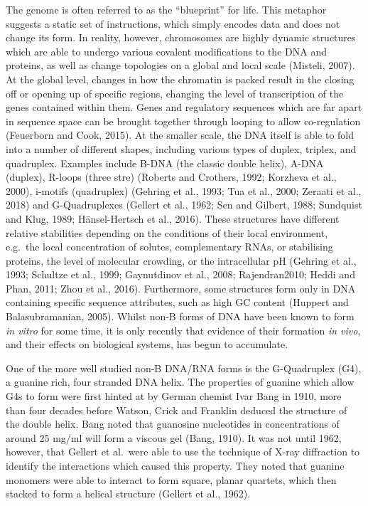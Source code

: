 \documentclass[12pt,a4paper,]{report}
\begin{document}
\label{ssec:what_is_a_g4}

The genome is often referred to as the ``blueprint'' for life. This
metaphor suggests a static set of instructions, which simply encodes
data and does not change its form. In reality, however, chromosomes are
highly dynamic structures which are able to undergo various covalent
modifications to the DNA and proteins, as well as change topologies on a
global and local scale (Misteli, 2007). At the global level, changes in
how the chromatin is packed result in the closing off or opening up of
specific regions, changing the level of transcription of the genes
contained within them. Genes and regulatory sequences which are far
apart in sequence space can be brought together through looping to allow
co-regulation (Feuerborn and Cook, 2015). At the smaller scale, the DNA
itself is able to fold into a number of different shapes, including
various types of duplex, triplex, and quadruplex. Examples include B-DNA
(the classic double helix), A-DNA (duplex), R-loops (three stre)
(Roberts and Crothers, 1992; Korzheva et al., 2000), i-motifs
(quadruplex) (Gehring et al., 1993; Tua et al., 2000; Zeraati et al.,
2018) and G-Quadruplexes (Gellert et al., 1962; Sen and Gilbert, 1988;
Sundquist and Klug, 1989; Hänsel-Hertsch et al., 2016). These structures
have different relative stabilities depending on the conditions of their
local environment, e.g.~the local concentration of solutes,
complementary RNAs, or stabilising proteins, the level of molecular
crowding, or the intracellular pH (Gehring et al., 1993; Schultze et
al., 1999; Gaynutdinov et al., 2008; Rajendran2010; Heddi and Phan,
2011; Zhou et al., 2016). Furthermore, some structures form only in DNA
containing specific sequence attributes, such as high GC content
(Huppert and Balasubramanian, 2005). Whilst non-B forms of DNA have been
known to form \emph{in vitro} for some time, it is only recently that
evidence of their formation \emph{in vivo}, and their effects on
biological systems, has begun to accumulate.

One of the more well studied non-B DNA/RNA forms is the G-Quadruplex
(G4), a guanine rich, four stranded DNA helix. The properties of guanine
which allow G4s to form were first hinted at by German chemist Ivar Bang
in 1910, more than four decades before Watson, Crick and Franklin
deduced the structure of the double helix. Bang noted that guanosine
nucleotides in concentrations of around 25 mg/ml will form a viscous gel
(Bang, 1910). It was not until 1962, however, that Gellert et al.~were
able to use the technique of X-ray diffraction to identify the
interactions which caused this property. They noted that guanine
monomers were able to interact to form square, planar quartets, which
then stacked to form a helical structure (Gellert et al., 1962).
\end{document}
